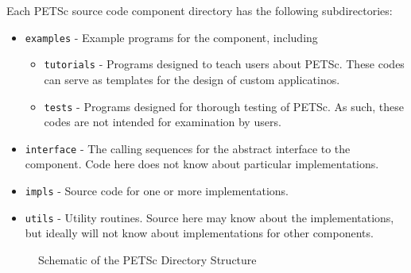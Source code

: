 Each PETSc source code component directory has the following subdirectories:
\begin{itemize}
\item  {\tt examples} - Example programs for the component, including
  \begin{itemize}
  \item {\tt tutorials} - Programs designed to teach users about PETSc.  These
          codes can serve as templates for the design of custom applicatinos.
  \item {\tt tests} - Programs designed for thorough testing of PETSc.  As such,
          these codes are not intended for examination by users.
  \end{itemize}
\item  {\tt interface} - The calling sequences for the abstract interface  
        to the component.
        Code here does not know about particular implementations.
\item  {\tt impls} - Source code for one or more implementations.
\item  {\tt utils} - Utility routines.  Source here may know about the 
          implementations, but ideally will not know about implementations
          for other components.
\end{itemize}

\begin{figure}[tb]
\centerline{}
\nobreak
\caption{Schematic of the PETSc Directory Structure}
\label{fig:directories}
\end{figure}


